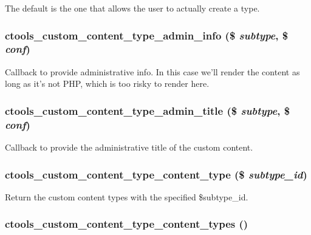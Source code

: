 The default is the one that allows the user to actually create a type. \hypertarget{custom_8inc_a8c8379863987f4dcdcc64ad245dca7fb}{
\subsubsection[{ctools\_\-custom\_\-content\_\-type\_\-admin\_\-info}]{\setlength{\rightskip}{0pt plus 5cm}ctools\_\-custom\_\-content\_\-type\_\-admin\_\-info (\$ {\em subtype}, \/  \$ {\em conf})}}
\label{custom_8inc_a8c8379863987f4dcdcc64ad245dca7fb}
Callback to provide administrative info. In this case we'll render the content as long as it's not PHP, which is too risky to render here. \hypertarget{custom_8inc_a986db525d75c5d19f7ad05859cd1f51b}{
\subsubsection[{ctools\_\-custom\_\-content\_\-type\_\-admin\_\-title}]{\setlength{\rightskip}{0pt plus 5cm}ctools\_\-custom\_\-content\_\-type\_\-admin\_\-title (\$ {\em subtype}, \/  \$ {\em conf})}}
\label{custom_8inc_a986db525d75c5d19f7ad05859cd1f51b}
Callback to provide the administrative title of the custom content. \hypertarget{custom_8inc_a4ddbda30a8235191fa739a18a3bc42c0}{
\subsubsection[{ctools\_\-custom\_\-content\_\-type\_\-content\_\-type}]{\setlength{\rightskip}{0pt plus 5cm}ctools\_\-custom\_\-content\_\-type\_\-content\_\-type (\$ {\em subtype\_\-id})}}
\label{custom_8inc_a4ddbda30a8235191fa739a18a3bc42c0}
Return the custom content types with the specified \$subtype\_\-id. \hypertarget{custom_8inc_a111ca5230b3530b710edb9b22f44ecaf}{
\subsubsection[{ctools\_\-custom\_\-content\_\-type\_\-content\_\-types}]{\setlength{\rightskip}{0pt plus 5cm}ctools\_\-custom\_\-content\_\-type\_\-content\_\-types ()}}
